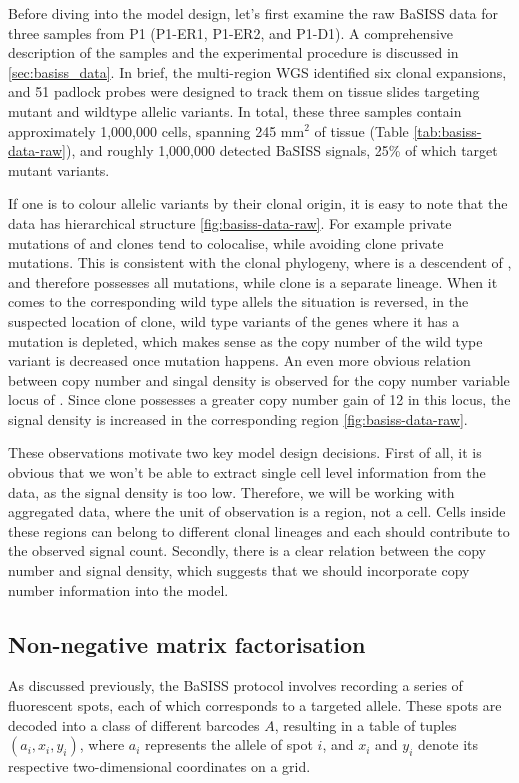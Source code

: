 Before diving into the model design, let's first examine the raw \ac{BaSISS} data for three samples from P1 (P1-ER1, P1-ER2, and P1-D1). A comprehensive description of the samples and the experimental procedure is discussed in \cref{sec:basiss_data}. In brief, the multi-region \ac{WGS} identified six clonal expansions, and 51 padlock probes were designed to track them on tissue slides targeting mutant and wildtype allelic variants. In total, these three samples contain approximately 1,000,000 cells, spanning 245 mm\(^2\) of tissue (Table \cref{tab:basiss-data-raw}), and roughly 1,000,000 detected \ac{BaSISS} signals, 25\% of which target mutant variants.

If one is to colour allelic variants by their clonal origin, it is easy to note that the data has hierarchical structure \cref{fig:basiss-data-raw}. For example private mutations of  and  clones tend to colocalise, while avoiding  clone private mutations. This is consistent with the clonal phylogeny, where  is a descendent of , and therefore possesses all  mutations, while  clone is a separate lineage. When it comes to the corresponding wild type allels the situation is reversed, in the suspected location of  clone, wild type variants of the genes where it has a mutation is depleted, which makes sense as the copy number of the wild type variant is decreased once mutation happens. An even more obvious relation between copy number and singal density is observed for the copy number variable locus of . Since  clone possesses a greater copy number gain of 12 in this locus, the signal density is increased in the corresponding region \cref{fig:basiss-data-raw}. 

These observations motivate two key model design decisions. First of all, it is obvious that we won't be able to extract single cell level information from the data, as the signal density is too low. Therefore, we will be working with aggregated data, where the unit of observation is a region, not a cell. Cells inside these regions can belong to different clonal lineages and each should contribute to the observed signal count. Secondly, there is a clear relation between the copy number and signal density, which suggests that we should incorporate copy number information into the model.

\subsection{Non-negative matrix factorisation}
As discussed previously, the \ac{BaSISS} protocol involves recording a series of fluorescent spots, each of which corresponds to a targeted allele. These spots are decoded into a class of different barcodes $A$, resulting in a table of tuples $(a_i, x_i, y_i)$, where $a_i$ represents the allele of spot $i$, and $x_i$ and $y_i$ denote its respective two-dimensional coordinates on a grid.

